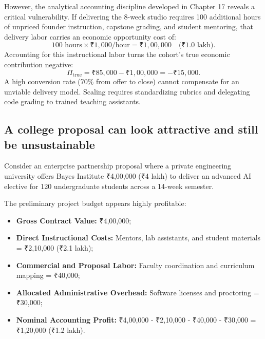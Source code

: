 However, the analytical accounting discipline developed in Chapter 17 reveals a critical vulnerability. If delivering the 8-week studio requires 100 additional hours of unpriced founder instruction, capstone grading, and student mentoring, that delivery labor carries an economic opportunity cost of:
\begin{equation}
100 \text{ hours} \times ₹1,000/\text{hour} = ₹1,00,000 \quad \text{(₹1.0 lakh)}.
\end{equation}
Accounting for this instructional labor turns the cohort's true economic contribution negative:
\begin{equation}
\Pi_{\text{true}} = ₹85,000 - ₹1,00,000 = -₹15,000.
\end{equation}
A high conversion rate (70\% from offer to close) cannot compensate for an unviable delivery model. Scaling requires standardizing rubrics and delegating code grading to trained teaching assistants.

\subsection{A college proposal can look attractive and still be unsustainable}

Consider an enterprise partnership proposal where a private engineering university offers Bayes Institute ₹4,00,000 (₹4 lakh) to deliver an advanced AI elective for 120 undergraduate students across a 14-week semester.

The preliminary project budget appears highly profitable:
\begin{itemize}
\item \textbf{Gross Contract Value:} ₹4,00,000;
\item \textbf{Direct Instructional Costs:} Mentors, lab assistants, and student materials = ₹2,10,000 (₹2.1 lakh);
\item \textbf{Commercial and Proposal Labor:} Faculty coordination and curriculum mapping = ₹40,000;
\item \textbf{Allocated Administrative Overhead:} Software licenses and proctoring = ₹30,000;
\item \textbf{Nominal Accounting Profit:} ₹4,00,000 - ₹2,10,000 - ₹40,000 - ₹30,000 = ₹1,20,000 (₹1.2 lakh).
\end{itemize}

